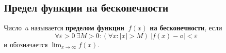 \subsection{Предел функции на бесконечности}
Число~$a$ называется \textbf{пределом функции~$f(x)$ на бесконечности}, если
\begin{equation*}
\forall \varepsilon > 0 \ \exists M > 0 \colon (\forall x \colon |x| > M) \ |f(x) - a| < \varepsilon
\end{equation*}
и обозначается $\displaystyle \lim_{x \to \infty} f(x)$.